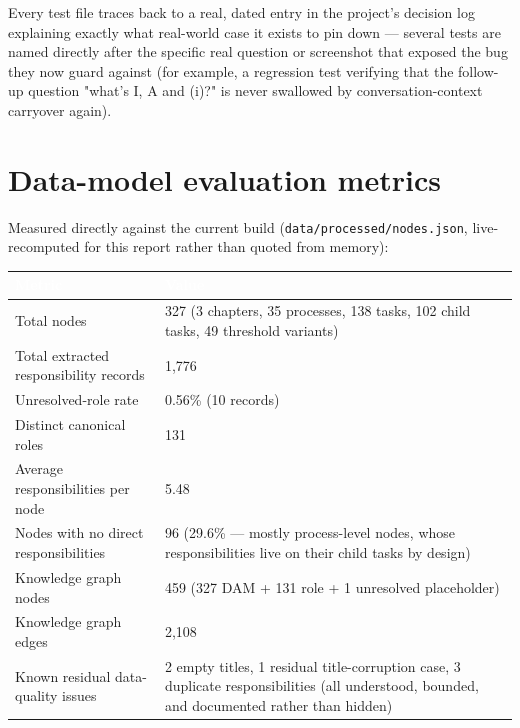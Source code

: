 Every test file traces back to a real, dated entry in the project's decision log explaining exactly what real-world case it exists to pin down — several tests are named directly after the specific real question or screenshot that exposed the bug they now guard against (for example, a regression test verifying that the follow-up question "what's I, A and (i)?" is never swallowed by conversation-context carryover again).

\section{Data-model evaluation metrics}
Measured directly against the current build (\texttt{data/\allowbreak{}processed/\allowbreak{}nodes.json}, live-recomputed for this report rather than quoted from memory):

\begin{longtable}{|p{}|p{}|}
\hline
\rowcolor{thesisgreen}\textcolor{white}{\textbf{Metric}} & \textcolor{white}{\textbf{Value}} \\
\hline\endhead
Total nodes & 327 (3 chapters, 35 processes, 138 tasks, 102 child tasks, 49 threshold variants) \\
\hline
Total extracted responsibility records & 1,776 \\
\hline
Unresolved-role rate & 0.56\% (10 records) \\
\hline
Distinct canonical roles & 131 \\
\hline
Average responsibilities per node & 5.48 \\
\hline
Nodes with no direct responsibilities & 96 (29.6\% — mostly process-level nodes, whose responsibilities live on their child tasks by design) \\
\hline
Knowledge graph nodes & 459 (327 DAM + 131 role + 1 unresolved placeholder) \\
\hline
Knowledge graph edges & 2,108 \\
\hline
Known residual data-quality issues & 2 empty titles, 1 residual title-corruption case, 3 duplicate responsibilities (all understood, bounded, and documented rather than hidden) \\
\hline
\end{longtable}
